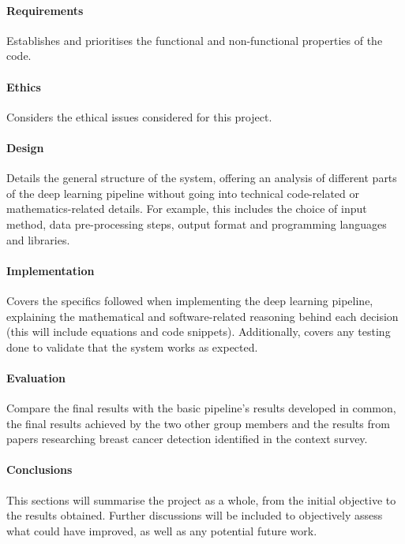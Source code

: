 \documentclass[letterpaper,12pt]{article}
\begin{document}
\paragraph{Requirements}
Establishes and prioritises the functional and non-functional properties of the code.

\paragraph{Ethics}
Considers the ethical issues considered for this project.

\paragraph{Design}
Details the general structure of the system, offering an analysis of different parts of the deep learning pipeline without going into technical code-related or mathematics-related details. For example, this includes the choice of input method, data pre-processing steps, output format and programming languages and libraries.

\paragraph{Implementation}
Covers the specifics followed when implementing the deep learning pipeline, explaining the mathematical and software-related reasoning behind each decision (this will include equations and code snippets). Additionally, covers any testing done to validate that the system works as expected.

\paragraph{Evaluation}
Compare the final results with the basic pipeline’s results developed in common, the final results achieved by the two other group members and the results from papers researching breast cancer detection identiﬁed in the context survey.

\paragraph{Conclusions}
This sections will summarise the project as a whole, from the initial objective to the results obtained. Further discussions will be included to objectively assess what could have improved, as well as any potential future work.


\end{document}
